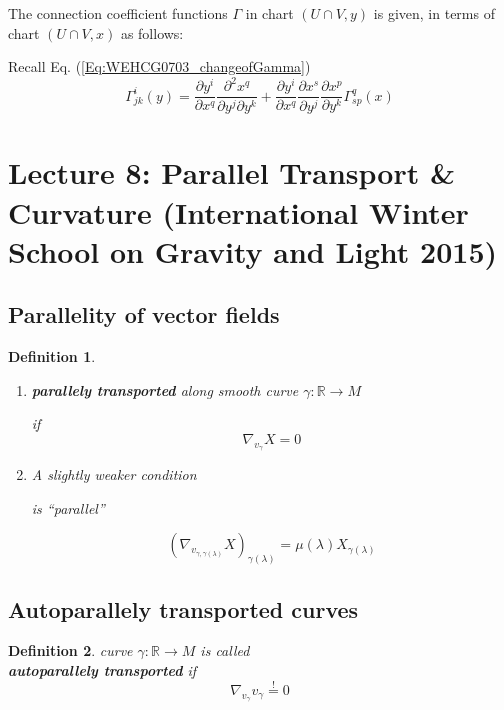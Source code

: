 \documentclass[10pt, twoside]{amsart}
\newtheorem{definition}{Definition}
\newcommand{\questionhead}[1]
  {\bigskip\bigskip
   \noindent{\small\bf Question #1.}
   \bigskip}
\begin{document}
\begin{multicols*}{2}
\questionhead{}

The connection coefficient functions $\Gamma$ in chart $(U \cap V,y)$ is given, in terms of chart $(U\cap V,x)$ as follows:

Recall Eq. (\ref{Eq:WEHCG0703_changeofGamma})
\[
\Gamma^i_{jk}(y) = \frac{ \partial y^i}{ \partial x^q} \frac{ \partial^2 x^q}{ \partial y^j \partial y^k} + \frac{ \partial y^i}{ \partial x^q } \frac{ \partial x^s }{ \partial y^j} \frac{ \partial x^p }{ \partial y^k} \Gamma^q_{sp}(x)
\]



\section{Lecture 8: Parallel Transport \& Curvature (International Winter School on Gravity and Light 2015)}

\subsection{Parallelity of vector fields}

\begin{definition}
\begin{enumerate}
\item[(1)]  \textbf{parallely transported} along smooth curve $\gamma: \mathbb{R} \to M$  

if 
\begin{equation}
  \boxed{ \nabla_{ v_{\gamma} } X = 0 }
\end{equation}
\item[(2)] A slightly weaker condition 

is ``parallel''

\[
( \nabla_{v_{\gamma, \gamma(\lambda)} } X)_{\gamma(\lambda)} = \mu(\lambda) X_{\gamma(\lambda)}
\]


\end{enumerate}
\end{definition}

\subsection{Autoparallely transported curves}

\begin{definition}
curve $\gamma: \mathbb{R} \to M$ is called \\
\textbf{autoparallely transported} if 
\begin{equation}
  \nabla_{v_{\gamma}}v_{\gamma} \overset{!}{=} 0
\end{equation}
\end{definition}



\end{multicols*}
\end{document}
